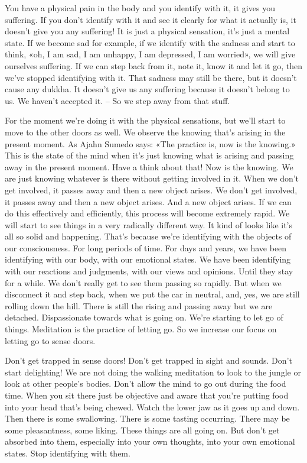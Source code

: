 \documentclass[letterpaper,10pt,english]{sphinxmanual}
\begin{document}
\sphinxAtStartPar
You have a physical pain in the body and you identify with it, it gives
you suffering. If you don’t identify with it and see it clearly for what it actually is, it doesn’t give you any suffering! It is just a physical sensation, it’s
just a mental state. If we become sad for example, if we identify with the
sadness and start to think, «oh, I am sad, I am unhappy, I am depressed, I am
worried», we will give ourselves suffering. If we can step back from it, note
it, know it and let it go, then we’ve stopped identifying with it. That sadness
may still be there, but it doesn’t cause any dukkha. It doesn’t give us any suffering because it doesn’t belong to us. We haven’t accepted it. – So we step
  away from that stuff.

\sphinxAtStartPar
For the moment we’re doing it with the physical sensations, but we’ll
start to move to the other doors as well. We observe the knowing that’s arising in the present moment. As Ajahn Sumedo says: «The practice is, now is
the knowing.» This is the state of the mind when it’s just knowing what is
arising and passing away in the present moment. Have a think about that!
Now is the knowing. We are just knowing whatever is there without getting
involved in it. When we don’t get involved, it passes away and then a new
object arises. We don’t get involved, it passes away and then a new object
arises. And a new object arises. If we can do this effectively and efficiently,
this  process  will  become  extremely  rapid. We  will  start  to  see  things  in  a
very radically different way. It kind of looks like it’s all so solid and happening. That’s because we’re identifying with the objects of our consciousness. For long periods of time. For days and years, we have been identifying
with our body, with our emotional states. We have been identifying with our
reactions and judgments, with our views and opinions. Until they stay for a
while. We don’t really get to see them passing so rapidly. But when we disconnect it and step back, when we put the car in neutral, and, yes, we are still
rolling down the hill. There is still the rising and passing away but we are
detached. Dispassionate towards what is going on. We’re starting to let go of
things. Meditation is the practice of letting go. So we increase our focus on
letting go to sense doors.

\sphinxAtStartPar
Don’t get trapped in sense doors! Don’t get trapped in sight and sounds.
Don’t start delighting! We are not doing the walking meditation to look to
the jungle or look at other people’s bodies. Don’t allow the mind to go out
during the food time. When you sit there just be objective and aware that
you’re putting food into your head that’s being chewed. Watch the lower jaw
as it goes up and down. Then there is some swallowing. There is some tasting occurring. There may be some pleasantness, some liking. These things
are all going on. But don’t get absorbed into them, especially into your own
thoughts, into your own emotional states. Stop identifying with them.
\end{document}
